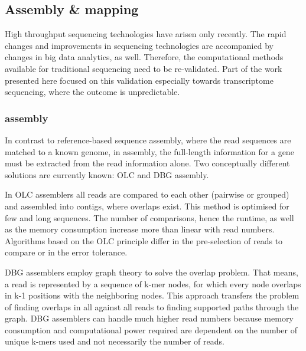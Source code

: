 \subsection{Assembly \& mapping}
High throughput sequencing technologies have arisen only recently.
The rapid changes and improvements in sequencing technologies are accompanied by changes in big data analytics, as well.
Therefore, the computational methods available for traditional sequencing need to be re-validated.
Part of the work presented here focused on this validation especially towards  transcriptome sequencing, where the outcome is unpredictable.
\subsubsection{ assembly}
In contrast to reference-based sequence assembly, where the read sequences are matched to a known genome, in  assembly, the full-length information for a gene must be extracted from the read information alone.
Two conceptually different solutions are currently known: \ac{OLC} and \ac{DBG} assembly.

In \ac{OLC} assemblers all reads are compared to each other (pairwise or grouped) and assembled into contigs, where overlaps exist.
This method is optimised for few and long sequences.
The number of comparisons, hence the runtime, as well as the memory consumption increase more than linear with read numbers.
Algorithms based on the \ac{OLC} principle differ in the pre-selection of reads to compare or in the error tolerance.

\ac{DBG} assemblers employ graph theory to solve the overlap problem.
That means, a read is represented by a sequence of k-mer nodes, for which every node overlaps in k-1 positions with the neighboring nodes.
This approach transfers the problem of finding overlaps in all against all reads to finding supported paths through the graph.
\ac{DBG} assemblers can handle much higher read numbers because memory consumption and computational power required are dependent on the number of unique k-mers used and not necessarily the number of reads.


